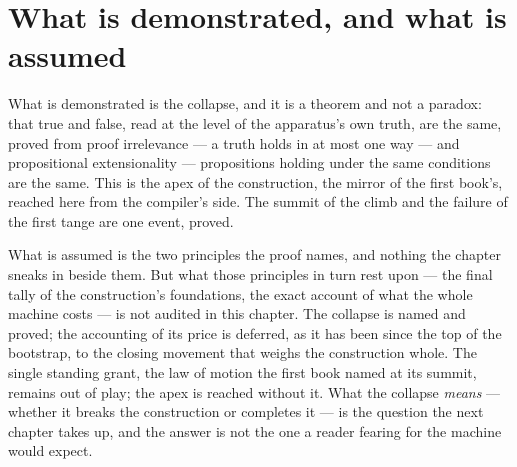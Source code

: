 \section{What is demonstrated, and what is assumed}
\label{se:demonstrated-assumed-II2}

What is demonstrated is the collapse, and it is a theorem and not a paradox: that true and false, read at
the level of the apparatus's own truth, are the same, proved from proof irrelevance --- a truth holds in at
most one way --- and propositional extensionality --- propositions holding under the same conditions are
the same. This is the apex of the construction, the mirror of the first book's, reached here from the
compiler's side. The summit of the climb and the failure of the first tange are one event, proved.

What is assumed is the two principles the proof names, and nothing the chapter sneaks in beside them. But
what those principles in turn rest upon --- the final tally of the construction's foundations, the exact
account of what the whole machine costs --- is not audited in this chapter. The collapse is named and
proved; the accounting of its price is deferred, as it has been since the top of the bootstrap, to the
closing movement that weighs the construction whole. The single standing grant, the law of motion the
first book named at its summit, remains out of play; the apex is reached without it. What the collapse
\emph{means} --- whether it breaks the construction or completes it --- is the question the next chapter
takes up, and the answer is not the one a reader fearing for the machine would expect.
